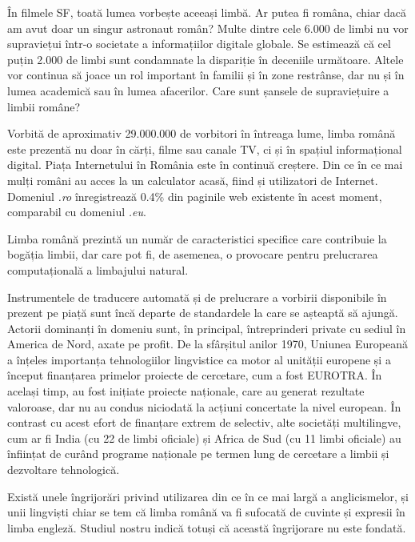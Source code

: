 \begin{multicols}{2}

În filmele SF, toată lumea vorbește aceeași limbă. Ar putea fi româna, chiar dacă am avut doar un singur astronaut român? Multe dintre cele 6.000 de limbi nu vor supraviețui \mbox{într-o} societate a informațiilor digitale globale. Se estimează că cel puțin 2.000 de limbi sunt condamnate la dispariție în deceniile următoare. Altele vor continua să joace un rol important în familii și în zone restrânse, dar nu și în lumea academică sau în lumea afacerilor. Care sunt șansele de supraviețuire a limbii române?

Vorbită de aproximativ 29.000.000 de vorbitori în întreaga lume, limba română este prezentă nu doar în cărți, filme sau canale TV, ci și în spațiul informațional digital. Piața Internetului în România este în continuă creștere. Din ce în ce mai mulți români au acces la un calculator acasă, fiind și utilizatori de Internet. Domeniul \textit{.ro} înregistrează 0.4\% din paginile web existente în acest moment, comparabil cu domeniul \textit{.eu}. 

Limba română prezintă un număr de caracteristici specifice care contribuie la bogăția limbii, dar care pot fi, de asemenea, o provocare pentru prelucrarea computațională a limbajului natural.

Instrumentele de traducere automată și de prelucrare a vorbirii disponibile în prezent pe piață sunt încă departe de standardele la care se așteaptă să ajungă. Actorii dominanți în domeniu sunt, în principal, întreprinderi private cu sediul în America de Nord, axate pe profit. De la sfârșitul anilor 1970, Uniunea Europeană a înțeles importanța tehnologiilor lingvistice ca motor al unității europene și a început finanțarea primelor proiecte de cercetare, cum a fost EUROTRA. În același timp, au fost inițiate proiecte naționale, care au generat rezultate valoroase, dar nu au condus niciodată la acțiuni concertate la nivel european. În contrast cu acest efort de finanțare extrem de selectiv, alte societăți multilingve, cum ar fi India (cu 22 de limbi oficiale) și Africa de Sud (cu 11 limbi oficiale) au înființat de curând programe naționale pe termen lung de cercetare a limbii și dezvoltare tehnologică.

Există unele îngrijorări privind utilizarea din ce în ce mai largă a anglicismelor, și unii lingviști chiar se tem că limba română va fi sufocată de cuvinte și expresii în limba engleză. Studiul nostru indică totuși că această îngrijorare nu este fondată. 


\end{multicols}
